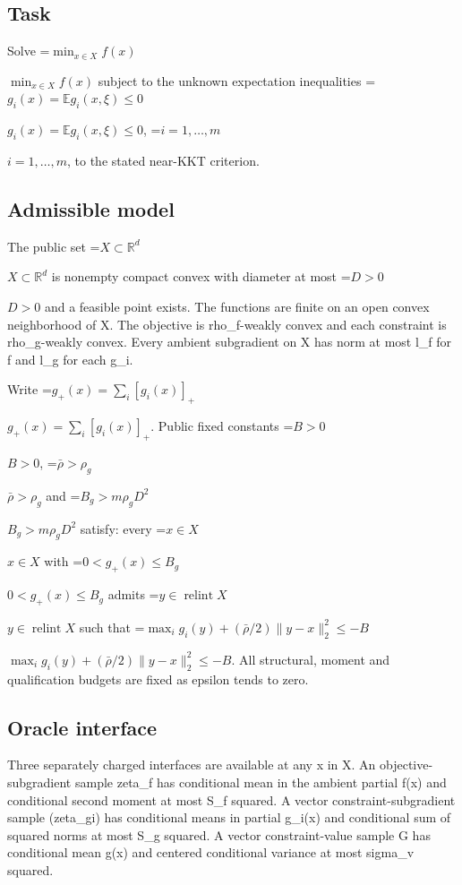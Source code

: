 \documentclass[10pt,a4paper]{article}
\newcommand{\AtlasMath}[1]{\par\begingroup\centering\setbox0=\hbox{$\displaystyle #1$}\ifdim\wd0>1.4\linewidth\typeout{ATLAS WIDE FORMULA: \the\wd0}\fi\ifdim\wd0>\linewidth\resizebox{\linewidth}{!}{\box0}\else\box0\fi\par\endgroup}
\newcommand{\AtlasInlineMath}[1]{\begingroup\setbox0=\hbox{$#1$}\ifdim\wd0>.4\linewidth\endgroup\AtlasMath{#1}\else\endgroup$#1$\fi}
\begin{document}
\subsection{Task}


Solve \AtlasInlineMath{\min_{x\in X} f(x)} subject to the unknown expectation inequalities \AtlasInlineMath{g_i(x)=\mathbb E g_i(x,\xi)\le0}, \AtlasInlineMath{i=1,\ldots,m}, to the stated near-KKT criterion.



\subsection{Admissible model}


The public set \AtlasInlineMath{X\subset\mathbb R^d} is nonempty compact convex with diameter at most \AtlasInlineMath{D>0} and a feasible point exists. The functions are finite on an open convex neighborhood of X. The objective is rho\_f-weakly convex and each constraint is rho\_g-weakly convex. Every ambient subgradient on X has norm at most l\_f for f and l\_g for each g\_i.



Write \AtlasInlineMath{g_+(x)=\sum_i[g_i(x)]_+}. Public fixed constants \AtlasInlineMath{B>0}, \AtlasInlineMath{\bar\rho>\rho_g} and \AtlasInlineMath{B_g>m\rho_gD^2} satisfy: every \AtlasInlineMath{x\in X} with \AtlasInlineMath{0<g_+(x)\le B_g} admits \AtlasInlineMath{y\in\operatorname{relint}X} such that \AtlasInlineMath{\max_i g_i(y)+(\bar\rho/2)\|y-x\|_2^2\le-B}. All structural, moment and qualification budgets are fixed as epsilon tends to zero.



\subsection{Oracle interface}


Three separately charged interfaces are available at any x in X. An objective-subgradient sample zeta\_f has conditional mean in the ambient partial f(x) and conditional second moment at most S\_f squared. A vector constraint-subgradient sample (zeta\_gi) has conditional means in partial g\_i(x) and conditional sum of squared norms at most S\_g squared. A vector constraint-value sample G has conditional mean g(x) and centered conditional variance at most sigma\_v squared.
\end{document}
